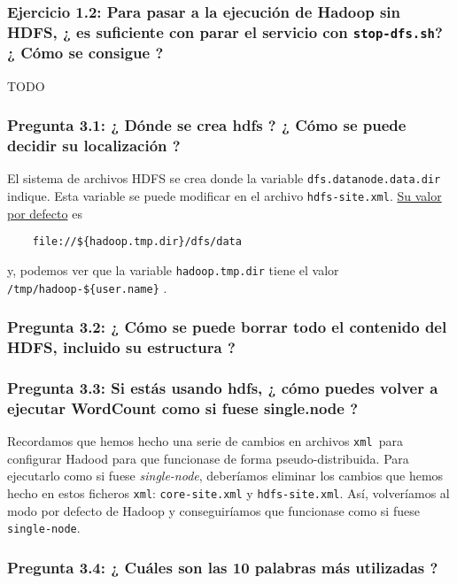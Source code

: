 \documentclass[11pt]{article}
\def\inline{\lstinline[basicstyle=\ttfamily,keywordstyle={}]}
\begin{document}
\subsubsection*{ Ejercicio 1.2: Para pasar a la ejecución de Hadoop sin HDFS, ¿ es suficiente con parar el servicio con  \inline{stop-dfs.sh}? ¿ Cómo se consigue ? }

TODO





\subsubsection*{ Pregunta 3.1: ¿ Dónde se crea hdfs ? ¿ Cómo se puede decidir su localización ? }

El sistema de archivos HDFS se crea donde la variable \inline{dfs.datanode.data.dir }indique. Esta variable se puede modificar en el archivo  \inline{hdfs-site.xml}. \href{https://hadoop.apache.org/docs/r2.4.1/hadoop-project-dist/hadoop-hdfs/hdfs-default.xml}{Su valor por defecto} es
\begin{verbatim}
	file://${hadoop.tmp.dir}/dfs/data
\end{verbatim}
y, podemos ver que la variable  \inline{hadoop.tmp.dir} tiene el valor \inline|/tmp/hadoop-${user.name}| .


\subsubsection*{ Pregunta 3.2: ¿ Cómo se puede borrar todo el contenido del HDFS, incluido su estructura ?}


\subsubsection*{ Pregunta 3.3: Si estás usando hdfs, ¿ cómo puedes volver a ejecutar WordCount como si fuese single.node ? }

Recordamos que hemos hecho una serie de cambios en archivos \inline{xml }para configurar Hadood para que funcionase de forma pseudo-distribuida. Para ejecutarlo como si fuese \emph{single-node}, deberíamos eliminar los cambios que hemos hecho en estos ficheros  \inline{xml}:  \inline{core-site.xml} y  \inline{hdfs-site.xml}. Así, volveríamos al modo por defecto de Hadoop y conseguiríamos que funcionase como si fuese  \inline{single-node}.


\subsubsection*{ Pregunta 3.4: ¿ Cuáles son las 10 palabras más utilizadas ? }
\end{document}
